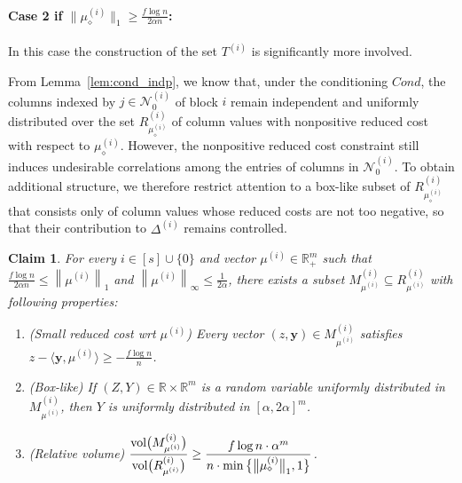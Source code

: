 \documentclass{article}
\newcommand{\R}{\mathbb{R}}
\newcommand{\ip}{\iprods}
\newcommand{\cN}{\mathcal{N}}
\newcommand{\norm}[1]{\left\lVert#1\right\rVert}
\newcommand{\yv}[0]{\mathbf{y}}
\newcommand{\vol}{\textup{vol}}
\newcommand{\normm}[1]{\big\lVert#1\big\rVert}
\newcommand{\iprods}[2]{\langle {#1}, {#2} \rangle}
\newtheorem{claim}[thm]{Claim}
\newcommand{\nrc}{R}
\begin{document}
\paragraph{Case 2 if $\normm{\mu_{\diamond}^{(i)}}_1 \ge \frac{f  \log n}{2\alpha n}$:} In this case the construction of the set $T^{(i)}$ is significantly more involved. 

From Lemma~\ref{lem:cond_indp}, we know that, under the conditioning $Cond$, the
columns indexed by $j \in \cN_0^{(i)}$ of block $i$ remain independent and
uniformly distributed over the set
$\nrc^{(i)}_{\mu^{(i)}_\diamond}$ of column values with nonpositive reduced cost
with respect to $\mu^{(i)}_\diamond$.
However, the nonpositive reduced cost constraint still induces undesirable
correlations among the entries of columns in $\cN_0^{(i)}$.
To obtain additional structure, we therefore restrict attention to a box-like
subset of $\nrc^{(i)}_{\mu^{(i)}_\diamond}$ that consists only of column values
whose reduced costs are not too negative, so that their contribution to
$\Delta^{(i)}$ remains controlled.



\begin{claim}
\label{claim:good_col}
For every $i \in [s] \cup \{0\}$ and vector $\mu^{(i)} \in \R^m_+$ such that $\frac{f \log n}{2\alpha n} \le \norm{\mu^{(i)}}_1$ and $\norm{\mu^{(i)}}_\infty \le \frac{1}{2\alpha}$, there exists a subset $M_{\mu^{(i)}}^{(i)} \subseteq \nrc_{\mu^{(i)}}^{(i)}$ with following properties:
\begin{enumerate}
    \item \vspace{-4pt} (Small reduced cost wrt $\mu^{(i)}$) Every vector $(z,\yv) \in M^{(i)}_{\mu^{(i)}}$ satisfies $z  - \ip{\yv}{\mu^{(i)}} \ge -\frac{f \log n}{n}$.


    \item \vspace{-4pt}  (Box-like) If $(Z,Y) \in \R \times \R^m$ is a random variable uniformly distributed in $M_{\mu^{(i)}}^{(i)}$, then $Y$ is uniformly distributed in $[\alpha,2\alpha]^m$.

    \item \vspace{-4pt} 
    (Relative volume) $\dfrac{\vol\big(M^{(i)}_{\mu^{(i)}}\big)}{\vol\big(\nrc^{(i)}_{\mu^{(i)}}\big)} \ge \dfrac{f \log n \cdot \alpha^{m}}{n \cdot \min\big\{\normm{\mu^{(i)}_\diamond}_1, 1 \big\}}$. 
\end{enumerate}
\end{claim}
\end{document}
